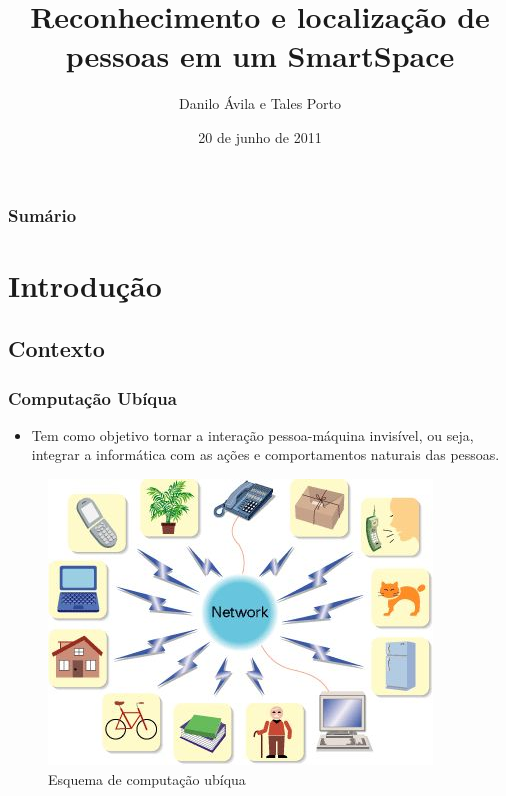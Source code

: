\documentclass{beamer}
\title{Reconhecimento e localização de pessoas em um SmartSpace}
\author{Danilo Ávila e  Tales Porto}
\institute[UnB]
{
    Departamento de Ciência da Computação\\
    Instituto de Ciências Exatas\\
    Universidade de Brasília
}
\date{20 de junho de 2011}
\begin{document}
\begin{frame}
\titlepage
\end{frame}


\begin{frame}
	\frametitle{Sumário}
	\tableofcontents
\end{frame}


\section{Introdução}

\subsection{Contexto}

\begin{frame}
    \frametitle{Computação Ubíqua}

	\begin{itemize}
  		\item Tem como objetivo tornar a interação pessoa-máquina invisível, ou seja, integrar a informática com as ações e comportamentos naturais das pessoas.
	\end{itemize}

    \begin{figure}[h]
    	\centering \includegraphics[scale=1.5]{figuras/ubiquitous.jpg}
    	\caption{Esquema de computação ubíqua}
	\label{esquema_computacao_ubiqua} 
    \end{figure}
\end{frame}
\end{document}
